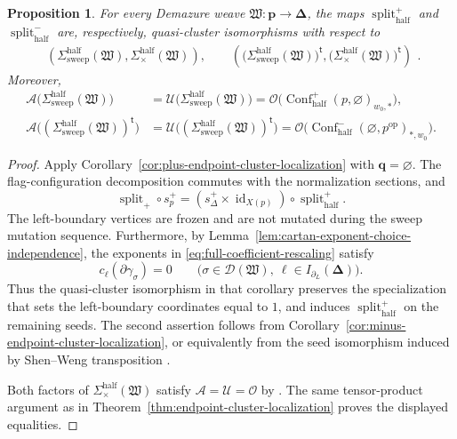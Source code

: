 \documentclass[10pt,a4paper]{article}
\newtheorem{proposition}[theorem]{Proposition}
\theoremstyle{definition}
\theoremstyle{remark}
\newcommand{\Confhalf}{\operatorname{Conf}_{\mathrm{half}}}
\newcommand{\Dcal}{\mathcal D}
\newcommand{\fW}{\mathfrak W}
\newcommand{\Split}{\operatorname{split}}
\newcommand{\id}{\operatorname{id}}
\begin{document}
\begin{proposition}
\label{prop:half-split-quasi-cluster}
For every Demazure weave \(\fW:\mathbf p\to\boldsymbol\Delta\), the maps
\(\Split_{\mathrm{half}}^+\) and \(\Split_{\mathrm{half}}^-\) are,
respectively, quasi-cluster isomorphisms with respect to
\[
 \begin{aligned}
 \left(
   \Sigma_{\mathrm{sweep}}^{\mathrm{half}}(\fW),
   \Sigma_{\times}^{\mathrm{half}}(\fW)
  \right),\qquad
 \left(
   \bigl(\Sigma_{\mathrm{sweep}}^{\mathrm{half}}(\fW)\bigr)^{\mathsf t},
   \bigl(\Sigma_{\times}^{\mathrm{half}}(\fW)\bigr)^{\mathsf t}
  \right)
 \end{aligned}.
\]
Moreover,
\[
 \begin{aligned}
 \mathcal A\bigl(\Sigma_{\mathrm{sweep}}^{\mathrm{half}}(\fW)\bigr)
 &=\mathcal U\bigl(\Sigma_{\mathrm{sweep}}^{\mathrm{half}}(\fW)\bigr)
  =\mathcal O\bigl(\Confhalf^+(p,\varnothing)_{w_0,*}\bigr),\\
 \mathcal A\bigl((\Sigma_{\mathrm{sweep}}^{\mathrm{half}}(\fW))^{\mathsf t}\bigr)
 &=\mathcal U\bigl((\Sigma_{\mathrm{sweep}}^{\mathrm{half}}(\fW))^{\mathsf t}\bigr)
  =\mathcal O\bigl(\Confhalf^-(\varnothing,p^{\mathrm{op}})_{*,w_0}\bigr).
 \end{aligned}
\]
\end{proposition}

\begin{proof}
Apply Corollary~\ref{cor:plus-endpoint-cluster-localization} with
\(\mathbf q=\varnothing\).  The flag-configuration decomposition commutes
with the normalization sections, and
\[
 \Split_+\circ s_p^+
 =
 (s_\Delta^+\times\id_{X(p)})\circ\Split_{\mathrm{half}}^+.
\]
The left-boundary vertices are frozen and are not mutated during the sweep
mutation sequence.  Furthermore, by
Lemma~\ref{lem:cartan-exponent-choice-independence}, the exponents in
\eqref{eq:full-coefficient-rescaling} satisfy
\[
 c_\ell(\partial\gamma_\sigma)=0
 \qquad
 \bigl(
  \sigma\in\Dcal(\fW),\
  \ell\in I_{\partial_L}(\boldsymbol\Delta)
 \bigr).
\]
Thus the quasi-cluster isomorphism in that corollary preserves the
specialization that sets the left-boundary coordinates equal to \(1\), and
induces \(\Split_{\mathrm{half}}^+\) on the remaining seeds.  The second
assertion follows from
Corollary~\ref{cor:minus-endpoint-cluster-localization}, or equivalently from
the seed isomorphism induced by Shen--Weng transposition
\cite[Proposition~3.9]{ShenWeng2021}.

Both factors of \(\Sigma_\times^{\mathrm{half}}(\fW)\) satisfy
\(\mathcal A=\mathcal U=\mathcal O\) by
\cite[Section~5.3 and Theorem~1.1]{CasalsEtAlBraidVarieties}.
The same tensor-product argument as in
Theorem~\ref{thm:endpoint-cluster-localization} proves the displayed equalities.
\end{proof}
\end{document}
